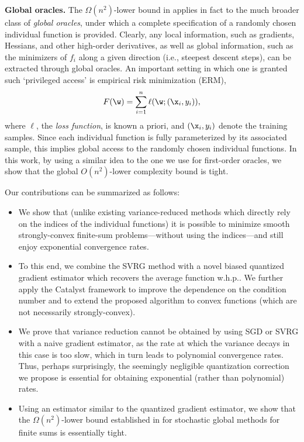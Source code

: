 \documentclass{article}
\theoremstyle{definition}  \newtheorem{exercise}{Exercise}
\theoremstyle{plain}
\theoremstyle{definition}
\theoremstyle{remark}
\begin{document}
\textbf{Global oracles.} The $\Omega(n^2)$-lower bound in \cite{arjevani2017limitations} 
	applies in fact to the much broader class of \emph{global oracles}, under 
	which 
	a complete specification of a randomly chosen 
	individual function is provided. Clearly, any local 
	information, such as gradients, Hessians, and other high-order derivatives, 
	as well as global information, such as the minimizers of $f_i$ along a 
	given direction (i.e., steepest descent steps), can be extracted through 
	global oracles. 
	An important 
	setting in which one is granted such `privileged access' is 
	empirical risk minimization (ERM),
	\begin{align}
	F(\w) = \sum_{i=1}^n \ell(\w; (\x_i,y_i)),
	\end{align}
	where $\ell$, the \emph{loss function}, is known a priori, and 
	$(\x_i,y_i)$ denote the training samples. Since each individual 
	function is fully parameterized by its associated sample, 
	this implies global access to the randomly chosen individual functions. 
	In this work, by using a similar idea to the one we use for first-order 
	oracles, 
	we show that the global $O(n^2)$-lower complexity bound is tight.
	
	
Our contributions can be summarized as follows: 
	\begin{itemize}[leftmargin=1em]
		\item We show that (unlike existing variance-reduced methods 
		which directly rely on the indices of the individual functions) it 
		is 
		possible to minimize smooth strongly-convex finite-sum 
		problems---without using the indices---and still enjoy exponential 
		convergence rates. 
		
		\item To this end, we combine the SVRG method with a novel 
		biased quantized gradient estimator which recovers the average 
		function 
		w.h.p.. We further apply the Catalyst framework to improve the 
		dependence on 
		the condition number and to extend the proposed algorithm to 
		convex 
		functions (which are not necessarily strongly-convex).
		
		
		\item We prove that variance reduction cannot be obtained by 
		using 
		SGD or SVRG with a naive gradient estimator, as the rate at which 
		the 
		variance decays in this case is too slow, which in turn leads to  
		polynomial convergence rates. Thus, perhaps surprisingly, the 
		seemingly negligible quantization correction we propose is 
		essential 
		for obtaining exponential (rather than polynomial) rates.  
		
		
		\item Using an estimator similar to the quantized gradient estimator, we show 
		that 
		the $\Omega(n^2)$-lower bound established in 		
		\cite{arjevani2017limitations} for stochastic global methods for 
		finite sums is essentially tight.
		
	\end{itemize}
	
\end{document}
